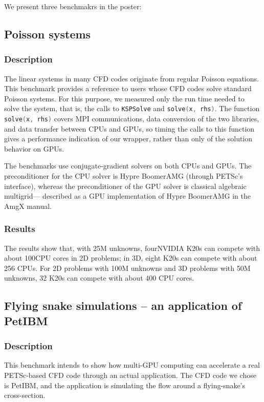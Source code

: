 We present three benchmakrs in the poster:

\subsection{Poisson systems}

    \subsubsection{Description}
    The linear systems in many CFD codes originate from regular Poisson equations.
    This benchmark provides a reference to users whose CFD codes solve standard Poisson systems.
    For this purpose, we measured only the run time needed to solve the system, that is, the calls to
    \lstinline[language=C++, basicstyle=\ttfamily]|KSPSolve| and
    \lstinline[language=C++, basicstyle=\ttfamily]|solve(x, rhs)|.
    The  function \lstinline[language=C++, basicstyle=\ttfamily]|solve(x, rhs)|
    covers MPI communications, data conversion of the two libraries, 
    and data transfer between CPUs and GPUs,
    so timing the calls to this
    function gives a performance indication of our wrapper, rather than only 
    of the solution behavior on GPUs.

    The benchmarks use conjugate-gradient solvers on both CPUs and GPUs.
    The preconditioner for the CPU solver is Hypre BoomerAMG 
    (through PETSc's interface),
    whereas the preconditioner of the GPU solver is classical algebraic multigrid--- 
    described as a GPU implementation of Hypre BoomerAMG in the AmgX
    manual\cite[see][p.130]{amgx-manual}.

    \subsubsection{Results}
    The results show that, with 25M unknowns,
    four\footnotemark[2] NVIDIA K20s can compete with about 100\footnotemark[3] 
    CPU cores in 2D problems;
    in 3D, eight K20s can compete with about 256 CPUs.
    For 2D problems with 100M unknowns and 3D problems with 50M unknowns,
    32 K20s can compete with about 400 CPU cores.

\subsection{Flying snake simulations -- an application of PetIBM}

    \subsubsection{Description}
    This benchmark intends to show how multi-GPU computing can accelerate a real
    PETSc-based CFD code through an actual application.
    The CFD code we chose is PetIBM\cite{petibm-repo}, 
    and the application is simulating the flow around a flying-snake's cross-section\cite{Krishnan-2013-ID33}.


